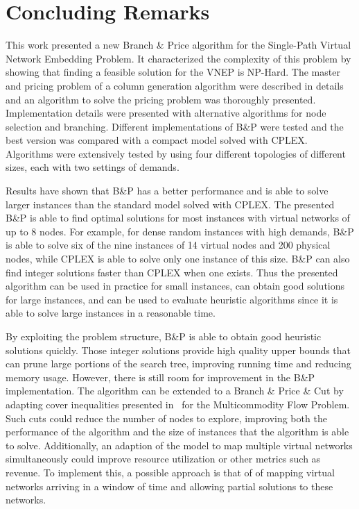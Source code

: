 \chapter{Concluding Remarks}
\label{ch:conclusion}

This work presented a new Branch \& Price algorithm for the Single-Path Virtual Network Embedding Problem.
It characterized the complexity of this problem by showing that finding a feasible solution for the VNEP is NP-Hard.
The master and pricing problem of a column generation algorithm were described in details and an algorithm to solve the pricing problem was thoroughly presented.
Implementation details were presented with alternative algorithms for node selection and branching.
Different implementations of B\&P were tested and the best version was compared with a compact model solved with CPLEX.
Algorithms were extensively tested by using four different topologies of different sizes, each with two settings of demands.

Results have shown that B\&P has a better performance and is able to solve larger instances than the standard model solved with CPLEX.
The presented B\&P is able to find optimal solutions for most instances with virtual networks of up to $8$ nodes. 
For example, for dense random instances with high demands, B\&P is able to solve six of the nine instances of 14 virtual nodes and 200 physical nodes, while CPLEX is able to solve only one instance of this size.
B\&P can also find integer solutions faster than CPLEX when one exists.
Thus the presented algorithm can be used in practice for small instances, can obtain good solutions for large instances, and can be used to evaluate heuristic algorithms since it is able to solve large instances in a reasonable time.

By exploiting the problem structure, B\&P is able to obtain good heuristic solutions quickly.
Those integer solutions provide high quality upper bounds that can prune large portions of the search tree, improving running time and reducing memory usage.
However, there is still room for improvement in the B\&P implementation.
The algorithm can be extended to a Branch \& Price \& Cut by adapting cover inequalities presented in~\cite{Barnhart:2000} for the Multicommodity Flow Problem.
Such cuts could reduce the number of nodes to explore, improving both the performance of the algorithm and the size of instances that the algorithm is able to solve.
Additionally, an adaption of the model to map multiple virtual networks simultaneously could improve resource utilization or other metrics such as revenue.
To implement this, a possible approach is that of \cite{Guerzoni:2014} of mapping virtual networks arriving in a window of time and allowing partial solutions to these networks.
